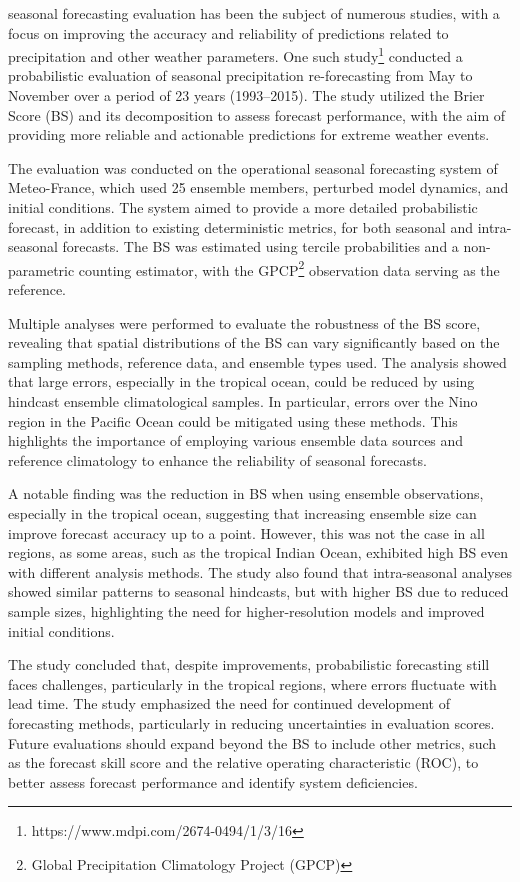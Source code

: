 seasonal forecasting evaluation has been the subject of numerous studies, with a focus on improving the accuracy and reliability of predictions related to precipitation and other weather parameters. One such study\footnote{https://www.mdpi.com/2674-0494/1/3/16} conducted a probabilistic evaluation of seasonal precipitation re-forecasting from May to November over a period of 23 years (1993–2015). The study utilized the Brier Score (BS) and its decomposition to assess forecast performance, with the aim of providing more reliable and actionable predictions for extreme weather events.

The evaluation was conducted on the operational seasonal forecasting system of Meteo-France, which used 25 ensemble members, perturbed model dynamics, and initial conditions. The system aimed to provide a more detailed probabilistic forecast, in addition to existing deterministic metrics, for both seasonal and intra-seasonal forecasts. The BS was estimated using tercile probabilities and a non-parametric counting estimator, with the GPCP\footnote{Global Precipitation Climatology Project (GPCP)} observation data serving as the reference.

Multiple analyses were performed to evaluate the robustness of the BS score, revealing that spatial distributions of the BS can vary significantly based on the sampling methods, reference data, and ensemble types used. The analysis showed that large errors, especially in the tropical ocean, could be reduced by using hindcast ensemble climatological samples. In particular, errors over the Nino region in the Pacific Ocean could be mitigated using these methods. This highlights the importance of employing various ensemble data sources and reference climatology to enhance the reliability of seasonal forecasts.

A notable finding was the reduction in BS when using ensemble observations, especially in the tropical ocean, suggesting that increasing ensemble size can improve forecast accuracy up to a point. However, this was not the case in all regions, as some areas, such as the tropical Indian Ocean, exhibited high BS even with different analysis methods. The study also found that intra-seasonal analyses showed similar patterns to seasonal hindcasts, but with higher BS due to reduced sample sizes, highlighting the need for higher-resolution models and improved initial conditions.

The study concluded that, despite improvements, probabilistic forecasting still faces challenges, particularly in the tropical regions, where errors fluctuate with lead time. The study emphasized the need for continued development of forecasting methods, particularly in reducing uncertainties in evaluation scores. Future evaluations should expand beyond the BS to include other metrics, such as the forecast skill score and the relative operating characteristic (ROC), to better assess forecast performance and identify system deficiencies.


